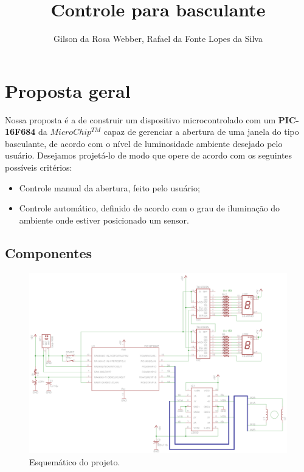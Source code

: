 ﻿\documentclass[12pt]{article}
\title{Controle para basculante}
\author{Gilson da Rosa Webber\inst{1}, Rafael da Fonte Lopes da Silva\inst{1}}
\begin{document}
 

\maketitle


\section{Proposta geral}
Nossa proposta é a de construir um dispositivo microcontrolado com um \textbf{PIC-16F684} da $MicroChip^{TM}$ capaz de gerenciar a abertura de uma janela do tipo basculante, de acordo com o nível de luminosidade ambiente desejado pelo usuário. Desejamos projetá-lo de modo que opere de acordo com os seguintes possíveis critérios:

\begin{itemize}
\item Controle manual da abertura, feito pelo usuário;
\item Controle automático, definido de acordo com o grau de iluminação do ambiente onde estiver posicionado um sensor.
\end{itemize}

\subsection{Componentes}
\begin{figure}[ht]
\begin{center}
\includegraphics[scale=0.5]{Esquematico.png} 
\caption{Esquemático do projeto.}
\end{center}
\end{figure}
\end{document}
